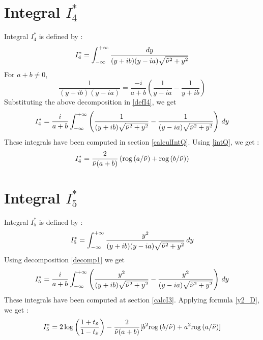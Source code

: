 \section{Integral $I_4^*$}
\label{calcI4}
Integral $I_4^*$ is defined by :
\begin{equation}
I_4^*=\int_{-\infty}^{+\infty} \dfrac{dy}{(y+ib)(y-ia)\sqrt{\tilde{\nu}^2+y^2}}
\label{defI4}
\end{equation}
For $a+b\neq0$, 
\begin{equation}
    \frac{1}{(y+ib)(y-ia)}=\frac{-i}{a+b}\left( \frac{1}{y-ia}-\frac{1}{y+ib}\right)
    \label{decomp1}
\end{equation}
Substituting the above decomposition in \eqref{defI4}, we get
\begin{equation}
I_4^*=\frac{i}{a+b} \int_{-\infty}^{+\infty} \left(\frac{1}{(y+ib)\sqrt{\tilde{\nu}^2+y^2}}-\frac{1}{(y-ia)\sqrt{\tilde{\nu}^2+y^2}} \right)\,dy
\end{equation}
These integrals have been computed in section \ref{calculIntQ}. Using \eqref{intQ}, we get :
\begin{equation}
I_4^*=\frac{2}{\tilde{\nu}(a+b)}\left(\mbox{rog}\left(a/\tilde{\nu}\right)+\mbox{rog}\left(b/\tilde{\nu}\right) \right)
\label{valI4}
\end{equation}

\section{Integral $I_5^*$}
\label{calcI5}

Integral $I_5^*$ is defined by :
\begin{equation}
I_5^*=\int_{-\infty}^{+\infty} \frac{y^2}{(y+ib)(y-ia)\sqrt{\tilde{\nu}^2+y^2}}\,dy
\label{defI5}
\end{equation}
Using decomposition \eqref{decomp1} we get
\begin{equation}
I_5^*=\frac{i}{a+b}\int_{-\infty}^{+\infty}\left( \frac{y^2}{(y+ib)\sqrt{\tilde{\nu}^2+y^2}}-\frac{y^2}{(y-ia)\sqrt{\tilde{\nu}^2+y^2}}\right)\,dy
\end{equation}
These integrals have been computed at section \ref{calcI3}. Applying formula \eqref{y2_D}, we get :
\begin{equation}
I_5^*=2\log\left(\frac{1+t_{\tilde{\nu}}}{1-t_{\tilde{\nu}}}\right)-\frac{2}{\tilde{\nu}(a+b)}\lbrack b^2\mbox{rog}\left(b/\tilde{\nu}\right)+a^2\mbox{rog}\left(a/\tilde{\nu}\right)\rbrack
\label{valI5}
\end{equation}

